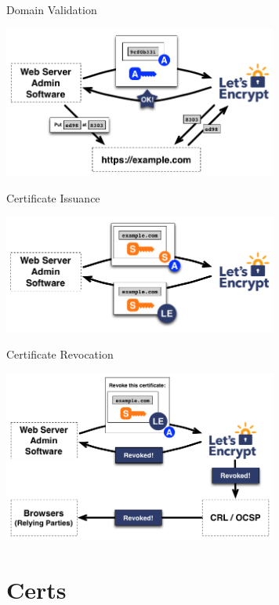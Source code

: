 \documentclass[xcolor=svgnames,11pt]{beamer}
\begin{document}
\begin{frame}{Domain Validation}
\begin{center}
\includegraphics[width=9cm]{img/proto_2.png}
\end{center}
\end{frame}

\begin{frame}{Certificate Issuance}
\begin{center}
\includegraphics[width=9cm]{img/proto_3.png}
\end{center}
\end{frame}

\begin{frame}{Certificate Revocation}
\begin{center}
\includegraphics[width=9cm]{img/proto_4.png}
\end{center}
\end{frame}

\section{Certs}
\end{document}

